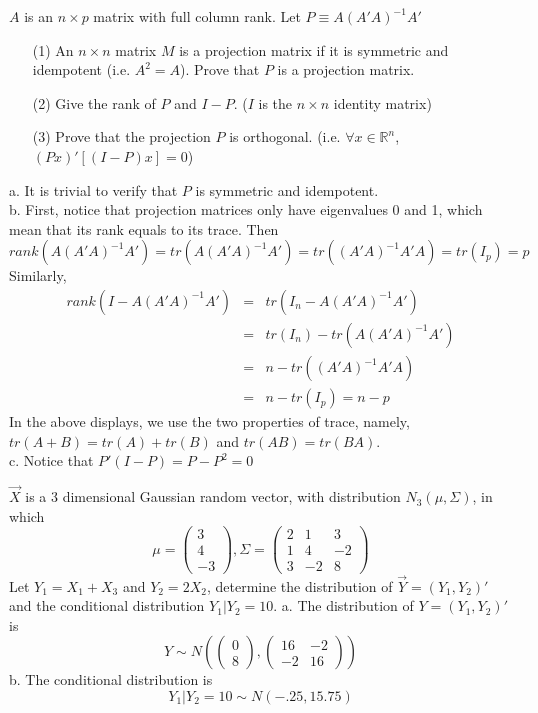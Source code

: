 \documentclass[12pt]{article}
\begin{document}
 {
 $A$ is an $n\times p$ matrix with full column rank. Let $P\equiv A(A'A)^{-1}A'$
\begin{enumerate}
\item[(1)] An $n\times n$ matrix $M$ is a projection matrix if it is symmetric and idempotent (i.e. $A^2=A$). Prove that $P$ is a projection matrix.
\item[(2)] Give the rank of $P$ and $I-P$. ($I$ is the $n\times n$ identity matrix)
\item[(3)] Prove that the projection $P$ is orthogonal. (i.e. $\forall x\in \mathbb{R}^n$, $(Px)'[(I-P)x]=0$)
\end{enumerate}
} { \vfill
  \answer
} {
a. It is trivial to verify that $P$ is symmetric and idempotent.\\
b. First, notice that projection matrices only have eigenvalues 0 and 1, which mean that its
rank equals to its trace. Then
$$rank(A(A'A)^{-1}A') = tr(A(A'A)^{-1}A') = tr((A'A)^{-1}A'A) = tr(I_p) = p$$
Similarly,
\begin{eqnarray*}
rank(I - A(A'A)^{-1}A') &=& tr(I_n - A(A'A)^{-1}A')\\
&=& tr(I_n) - tr(A(A'A)^{-1}A')\\
&=& n - tr((A'A)^{-1}A'A)\\
&=& n - tr(I_p) = n - p
\end{eqnarray*}
In the above displays, we use the two properties of trace, namely, $tr(A+B) = tr(A)+tr(B)$
and $tr(AB) = tr(BA)$.\\
c. Notice that $P'(I - P) = P - P^2 = 0$
 }

 {
$\vec{X}$ is a 3 dimensional Gaussian random vector, with distribution $N_3(\mu, \Sigma)$, in which
\[\mu=\begin{pmatrix} 3\\4\\-3\end{pmatrix}, \Sigma=\begin{pmatrix} 2&1&3\\1&4&-2\\3&-2&8\end{pmatrix}\]
Let $Y_1=X_1+X_3$ and $Y_2=2X_2$, determine the distribution of $\vec{Y}=(Y_1,Y_2)'$ and the conditional distribution $Y_1|Y_2=10$.
} { \vfill
  \answer
} {
a. The distribution of $Y = (Y_1, Y_2)'$ is
$$Y \sim N(\begin{pmatrix} 0\\8\end{pmatrix}, \begin{pmatrix} 16&-2\\-2&16\end{pmatrix})$$
b. The conditional distribution is
$$Y_1|Y_2 = 10 \sim N(-.25, 15.75)$$
 }
\end{document}
